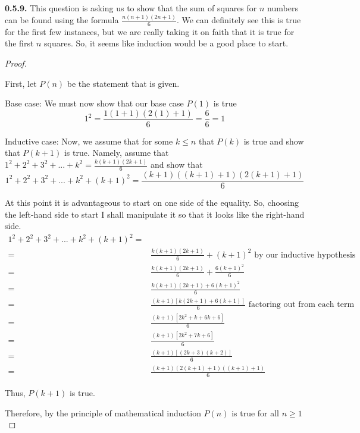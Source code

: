 \documentclass[10pt,]{book}
\theoremstyle{plain}
\theoremstyle{definition}
\theoremstyle{definition}
\theoremstyle{definition}
\theoremstyle{definition}
\numberwithin{equation}{chapter}
\newcommand{\amp}{&}
\begin{document}
\par\smallskip
\noindent\textbf{0.5.9.} \hypertarget{p-468}{}%
This question is asking us to show that the sum of squares for \(n\) numbers can be found using the formula \(\frac{n(n+1)(2n+1)}{6}\). We can definitely see this is true for the first few instances, but we are really taking it on faith that it is true for the first \(n\) squares. So, it seems like induction would be a good place to start.%
\begin{proof}\hypertarget{proof-12}{}
\hypertarget{p-469}{}%
First, let \(P(n)\) be the statement that is given.%
\par
\hypertarget{p-470}{}%
Base case: We must now show that our base case \(P(1)\) is true%
\begin{equation*}
1^2 = \frac{1(1+1)(2(1)+1)}{6} = \frac{6}{6} =1
\end{equation*}
%
\par
\hypertarget{p-471}{}%
Inductive case: Now, we assume that for some \(k\leq n\) that \(P(k)\) is true and show that \(P(k+1)\) is true. Namely, assume that \(1^2 +2^2 +3^2+...+k^2 = \frac{k(k+1)(2k+1)}{6}\) and show that%
\begin{equation*}
1^2 +2^2 +3^2+...+k^2+{(k+1)}^2 = \frac{(k+1)((k+1)+1)(2(k+1)+1)}{6}
\end{equation*}
%
\par
\hypertarget{p-472}{}%
At this point it is advantageous to start on one side of the equality. So, choosing the left-hand side to start I shall manipulate it so that it looks like the right-hand side.%
\begin{align*}
1^2 +2^2 +3^2+...+k^2+{(k+1)}^2 =\\
= \amp \frac{k(k+1)(2k+1)}{6} +(k+1)^2 \mbox{ by our inductive hypothesis}\\
= \amp \frac{k(k+1)(2k+1)}{6} +\frac{6(k+1)^2}{6}\\
= \amp \frac{k(k+1)(2k+1)+6(k+1)^2}{6}\\
= \amp \frac{(k+1)[k(2k+1)+6(k+1)]}{6} \mbox{ factoring out  from each term}\\
= \amp \frac{(k+1)[2k^2+k+6k+6]}{6}\\
= \amp \frac{(k+1)[2k^2+7k+6]}{6}\\
= \amp \frac{(k+1)[(2k+3)(k+2)]}{6}\\
= \amp \frac{(k+1)(2(k+1)+1)((k+1)+1)}{6}
\end{align*}
%
\par
\hypertarget{p-473}{}%
Thus, \(P(k+1)\) is true.%
\par
\hypertarget{p-474}{}%
Therefore, by the principle of mathematical induction \(P(n)\) is true for all \(n \geq 1\)%
\end{proof}
\end{document}
